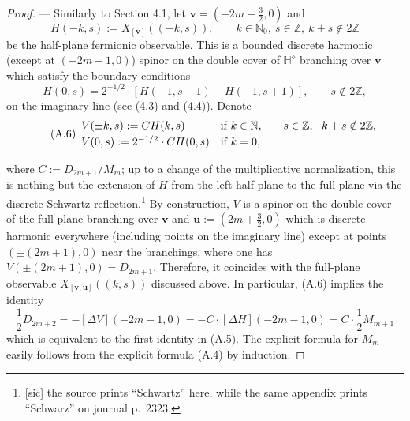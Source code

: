 \documentclass[11pt]{article}
\newcommand{\HHd}{\mathbb{H}^{\diamond}}
\begin{document}
\begin{proof}
--- Similarly to Section 4.1, let $\mathbf{v}=(-2m-\frac32,0)$ and
\[
  H(-k,s) := X_{[\mathbf{v}]}((-k,s)),\qquad
  k\in\mathbb{N}_0,\ s\in\mathbb{Z},\ k+s\notin 2\mathbb{Z}
\]
be the half-plane fermionic observable. This is a bounded discrete harmonic
(except at $(-2m-1,0)$) spinor on the double cover of $\HHd$ branching over
$\mathbf{v}$ which satisfy the boundary conditions
%
\[
  H(0,s) = 2^{-1/2}\cdot[H(-1,s-1)+H(-1,s+1)],\qquad s\notin 2\mathbb{Z},
\]
on the imaginary line (see (4.3) and (4.4)). Denote
\begin{equation}
  \tag{A.6}
  \begin{array}{ll@{\qquad}l}
    V(\pm k,s) := CH(k,s) & \text{if } k\in\mathbb{N}, &
      s\in\mathbb{Z},\ \ k+s\notin 2\mathbb{Z},\\[2pt]
    V(0,s) := 2^{-1/2}\cdot CH(0,s) & \text{if } k=0, &
  \end{array}
\end{equation}
%


where $C:=D_{2m+1}/M_m$; up to a change of the multiplicative normalization, this is
nothing but the extension of $H$ from the left half-plane to the full plane via the
discrete Schwartz reflection.\footnote{[sic] the source prints ``Schwartz'' here,
while the same appendix prints ``Schwarz'' on journal p.~2323.} By construction, $V$ is
a spinor on the double cover of the full-plane branching over $\mathbf{v}$ and
$\mathbf{u}:=(2m+\frac32,0)$ which is discrete harmonic everywhere (including points on
the imaginary line) except at points $(\pm(2m+1),0)$ near the branchings, where one has
$V(\pm(2m+1),0)=D_{2m+1}$. Therefore, it coincides with the full-plane observable
$X_{[\mathbf{v},\mathbf{u}]}((k,s))$ discussed above. In particular, (A.6) implies the
identity
\[
  \frac12 D_{2m+2} = -[\Delta V](-2m-1,0) = -C\cdot[\Delta H](-2m-1,0)
                  = C\cdot\frac12 M_{m+1}
\]
which is equivalent to the first identity in (A.5). The explicit formula for $M_m$
easily follows from the explicit formula (A.4) by induction.
\end{proof}
\end{document}
